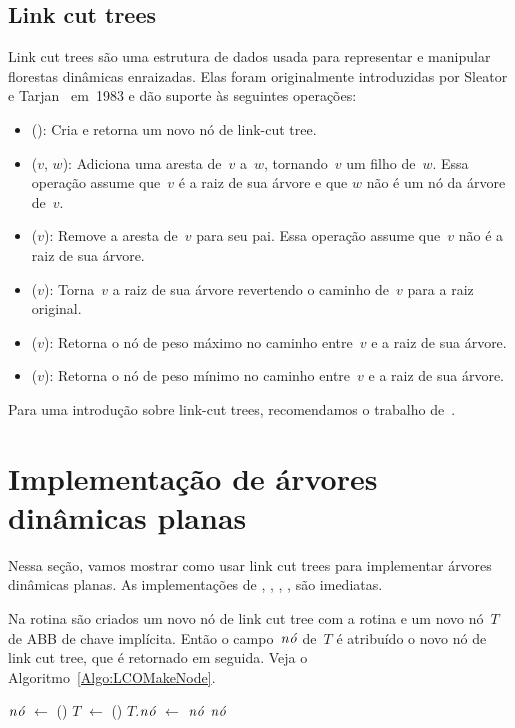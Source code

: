\subsection{Link cut trees}
\label{sec:linkcuttree}
Link cut trees são uma estrutura de dados usada para representar e manipular florestas dinâmicas enraizadas.
Elas foram originalmente introduzidas por Sleator e Tarjan~\cite{SleatroTarjanLinkCutTree1983,} em~1983 e dão suporte às seguintes operações:
\begin{itemize}
\item \linkcutCreate(): Cria e retorna um novo nó de link-cut tree.
\item \linkcutAddEdge($v$, $w$): Adiciona uma aresta de~$v$ a~$w$, tornando~$v$ um filho de~$w$. Essa operação assume que~$v$ é a raiz de sua árvore e que $w$ não é um nó da árvore de~$v$.
\item \linkcutDelEdge($v$): Remove a aresta de~$v$ para seu pai.
	Essa operação assume que~$v$ não é a raiz de sua árvore.
\item \linkcutEvert($v$): Torna~$v$ a raiz de sua árvore revertendo o caminho de~$v$ para a raiz original.
\item \linkcutMax($v$): Retorna o nó de peso máximo no caminho entre~$v$ e a raiz de sua árvore.
\item \linkcutMin($v$): Retorna o nó de peso mínimo no caminho entre~$v$ e a raiz de sua árvore.
\end{itemize}


Para uma introdução sobre link-cut trees, recomendamos o trabalho de~\cite{linkcuttree}.

\section{Implementação de árvores dinâmicas planas}
\label{sec:implementacao-ADP}

Nessa seção, vamos mostrar como usar link cut trees para implementar árvores dinâmicas planas. As implementações de \LCOMakeNode{}, \LCOAddCost{}, \LCOMax{}, \LCOMin, \LCOFindNode{} são imediatas.

Na rotina \LCOMakeNode{} são criados um novo nó de link cut tree com a rotina \linkcutCreate{} e um novo nó~$T$ de ABB de chave implícita.
Então o campo~$\mathit{n\acute{o}}$ de~$T$ é atribuído o novo nó de link cut tree, que é retornado em seguida. Veja o Algoritmo~\ref{Algo:LCOMakeNode}.

\begin{algorithm}[htb]
\caption{\LCOMakeNode()}
\label{Algo:LCOMakeNode}
\begin{algorithmic}[1]
\State $\mathit{n\acute{o}}$ $\gets$ \linkcutCreate()
\State $T$ $\gets$ \treapCreate()
\State $T$.$\mathit{n\acute{o}}$ $\gets$ $\mathit{n\acute{o}}$
\State \Return $\mathit{n\acute{o}}$
\end{algorithmic}
\end{algorithm}

